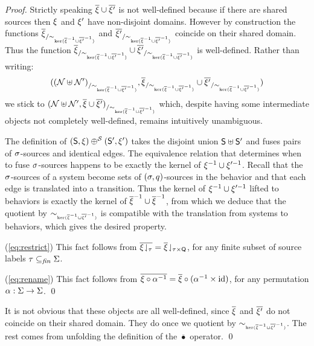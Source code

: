 \begin{textAtEnd}[category=proofs]
\begin{proof}
    Strictly speaking $\overline{\xi}\cup\overline{\xi'}$ is
    not well-defined because if there are shared sources then
    $\xi$ and $\xi'$ have non-disjoint domains.  However by
    construction the functions
    ${\overline{\xi}}_{/\sim_{\scriptscriptstyle{\mathrm{ker}(\overline{\xi}^{-1}\cup\overline{\xi'}^{-1})}}}$ and
    ${\overline{\xi'}}_{/\sim_{\scriptscriptstyle{\mathrm{ker}(\overline{\xi}^{-1}\cup\overline{\xi'}^{-1})}}}$
    coincide on their shared domain.  Thus the function
    ${\overline{\xi}}_{/\sim_{\scriptscriptstyle{\mathrm{ker}(\overline{\xi}^{-1}\cup\overline{\xi'}^{-1})}}} \cup
    {\overline{\xi'}}_{/\sim_{\scriptscriptstyle{\mathrm{ker}(\overline{\xi}^{-1}\cup\overline{\xi'}^{-1})}}}$ is
    well-defined.  Rather than writing: 
    \[({(\mathcal{N}\uplus\mathcal{N}')}_{/\sim_{\scriptscriptstyle{\mathrm{ker}(\overline{\xi}^{-1}\cup\overline{\xi'}^{-1})}}},
    {\overline{\xi}}_{/\sim_{\scriptscriptstyle{\mathrm{ker}(\overline{\xi}^{-1}\cup\overline{\xi'}^{-1})}}} \cup
    {\overline{\xi'}}_{/\sim_{\scriptscriptstyle{\mathrm{ker}(\overline{\xi}^{-1}\cup\overline{\xi'}^{-1})}}})\] we stick
    to ${(\mathcal{N} \uplus \mathcal{N}', \overline{\xi} \cup
      \overline{\xi'})}_{/\sim_{\scriptscriptstyle{\mathrm{ker}(\overline{\xi}^{-1}\cup\overline{\xi'}^{-1})}}}$ which,
    despite having some intermediate objects not completely
    well-defined, remains intuitively unambiguous.

    The definition of $(\mathsf{S},\xi) \oplus^{\mathcal{S}}
    (\mathsf{S}',\xi')$ takes the disjoint union $\mathsf{S} \uplus \mathsf{S}'$
    and fuses pairs of $\sigma$-sources and identical edges.  The
    equivalence relation that determines when to fuse $\sigma$-sources
    happens to be exactly the kernel of
    $\xi^{-1}\cup\xi'^{-1}$.  Recall that the
    $\sigma$-sources of a system become sets of $(\sigma,q)$-sources in
    the behavior and that each edge is translated into a transition.
    Thus the kernel of $\xi^{-1}\cup\xi'^{-1}$
    lifted to behaviors is exactly the kernel of
    $\overline{\xi}^{-1}\cup\overline{\xi}^{-1}$,
    from which we deduce that the quotient by $\sim_{\scriptscriptstyle{\mathrm{ker}(\overline{\xi}^{-1}\cup\overline{\xi'}^{-1})}}$ is
    compatible with the translation from systems to behaviors, which
    gives the desired property.  

    \vspace*{\baselineskip}
    \noindent
    (\ref{eq:restrict}) This fact follows from
    $\overline{{\xi}\!\downharpoonleft_{\tau}} =
    {\overline{\xi}}\!\downharpoonleft_{\tau\times\mathsf{Q}}$, for any finite subset of
    source labels $\tau\subseteq_{\mathit{fin}}\Sigma$.

    \vspace*{\baselineskip}
    \noindent
    (\ref{eq:rename}) This fact follows from $\overline{\xi \circ
      \alpha^{-1}} = \overline{\xi}\circ(\alpha^{-1}\times\mathrm{id})$,
    for any permutation $\alpha:\Sigma\rightarrow\Sigma$.  \qed
\end{proof}
\begin{proofSketch}
  It is not obvious that these objects are all well-defined,
  since $\overline{\xi}$ and $\overline{\xi'}$ do not coincide on their
  shared domain. They do once we quotient by $\sim_{\scriptscriptstyle{\mathrm{ker}(\overline{\xi}^{-1}\cup\overline{\xi'}^{-1})}}$.
  The rest comes from unfolding the definition of the $\overline{\bullet}$ operator.
  \qed
\end{proofSketch}
\ifLongVersion\else
\end{textAtEnd}
\fi

